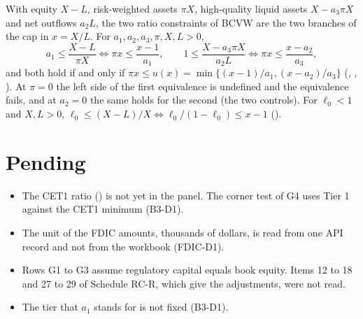 \documentclass[11pt]{article}
\begin{document}
With equity $X-L$, risk-weighted assets $\pi X$, high-quality liquid assets
$X-a_3\pi X$ and net outflows $a_2L$, the two ratio constraints of BCVW are
the two branches of the cap in $x=X/L$. For $a_1,a_2,a_3,\pi,X,L>0$,
\[
a_1\le\frac{X-L}{\pi X}\iff\pi x\le\frac{x-1}{a_1},\qquad
1\le\frac{X-a_3\pi X}{a_2L}\iff\pi x\le\frac{x-a_2}{a_3},
\]
and both hold if and only if $\pi x\le u(x)=\min\{(x-1)/a_1,(x-a_2)/a_3\}$
(, ,
). At $\pi=0$ the left side of the first
equivalence is undefined and the equivalence fails, and at $a_2=0$ the same
holds for the second (the two controls). For $\ell_0<1$ and $X,L>0$,
$\ell_0\le(X-L)/X\iff\ell_0/(1-\ell_0)\le x-1$
().

\section{Pending}

\begin{itemize}
\item The CET1 ratio () is not yet in the panel. The corner
  test of G4 uses Tier 1 against the CET1 minimum (B3-D1).
\item The unit of the FDIC amounts, thousands of dollars, is read from one
  API record and not from the workbook (FDIC-D1).
\item Rows G1 to G3 assume regulatory capital equals book equity. Items
  12 to 18 and 27 to 29 of Schedule RC-R, which give the adjustments, were
  not read.
\item The tier that $a_1$ stands for is not fixed (B3-D1).
\end{itemize}



\end{document}
